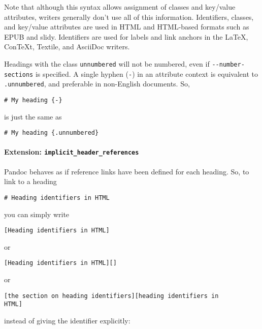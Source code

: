 \documentclass[
]{article}
\begin{document}
Note that although this syntax allows assignment of classes and
key/value attributes, writers generally don't use all of this
information. Identifiers, classes, and key/value attributes are used in
HTML and HTML-based formats such as EPUB and slidy. Identifiers are used
for labels and link anchors in the LaTeX, ConTeXt, Textile, and AsciiDoc
writers.

Headings with the class \texttt{unnumbered} will not be numbered, even
if \texttt{-\/-number-sections} is specified. A single hyphen
(\texttt{-}) in an attribute context is equivalent to
\texttt{.unnumbered}, and preferable in non-English documents. So,

\begin{verbatim}
# My heading {-}
\end{verbatim}

is just the same as

\begin{verbatim}
# My heading {.unnumbered}
\end{verbatim}

\hypertarget{extension-implicit_header_references}{%
\paragraph{\texorpdfstring{Extension:
\texttt{implicit\_header\_references}}{Extension: implicit\_header\_references}}\label{extension-implicit_header_references}}

Pandoc behaves as if reference links have been defined for each heading.
So, to link to a heading

\begin{verbatim}
# Heading identifiers in HTML
\end{verbatim}

you can simply write

\begin{verbatim}
[Heading identifiers in HTML]
\end{verbatim}

or

\begin{verbatim}
[Heading identifiers in HTML][]
\end{verbatim}

or

\begin{verbatim}
[the section on heading identifiers][heading identifiers in
HTML]
\end{verbatim}

instead of giving the identifier explicitly:
\end{document}
